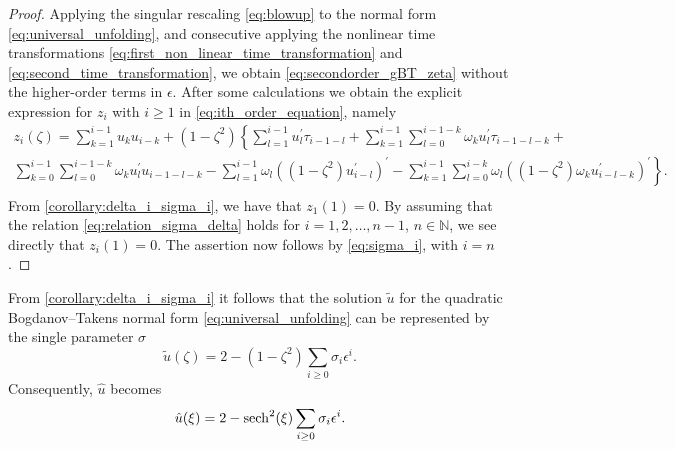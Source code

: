 \begin{proof}
    Applying the singular rescaling \cref{eq:blowup} to the normal form
    \cref{eq:universal_unfolding}, and consecutive applying the nonlinear time
    transformations \cref{eq:first_non_linear_time_transformation} and
    \cref{eq:second_time_transformation}, we obtain
    \cref{eq:secondorder_gBT_zeta} without the higher-order terms in $\epsilon$.
    After some calculations we obtain the explicit expression for $z_i$ with
    $i\geq 1$ in \cref{eq:ith_order_equation}, namely
    \begin{align*}
    z_i(\zeta) = 
         \sum_{k=1}^{i-1} u_k u_{i-k} 
         + (1-\zeta^2) \left\{ \sum_{l=1}^{i-1} 
          u_l^\prime \tau_{i-1-l}
         + \sum_{k=1}^{i-1} \sum_{l=0}^{i-1-k} 
           \omega_k u_l^\prime \tau_{i-1-l-k} + \right. \\
           \left. 
           \sum_{k=0}^{i-1} \sum_{l=0}^{i-1-k}
           \omega_k u_l^\prime u_{i-1-l-k} 
         - \sum_{l=1}^{i-1}
           \omega_l \left((1-\zeta^2)
           u_{i-l}^\prime \right)^\prime
         - \sum_{k=1}^{i-1} \sum_{l=0}^{i-k}
           \omega_l \left((1-\zeta^2)\omega_k u_{i-l-k}^\prime
           \right)^\prime \right\}. \nonumber \\
    \end{align*}
    From \cref{corollary:delta_i_sigma_i}, we have that $z_1(1)=0$. By
    assuming that the relation \cref{eq:relation_sigma_delta} holds for
    $i=1,2,\dots,n-1$,  $n\in\mathbb N$, we see directly that  $z_i(1)=0$. The
    assertion now follows by \cref{eq:sigma_i}, with $i=n$.
\end{proof}

\begin{remark}
    From \cref{corollary:delta_i_sigma_i} it follows that the solution $\tilde
    u$ for the quadratic Bogdanov--Takens normal form
    \cref{eq:universal_unfolding} can be represented by the single parameter
    $\sigma$
    \begin{equation*}
        \tilde u(\zeta) = 2 - (1-\zeta^2)\sum_{i\geq 0} \sigma_i \epsilon^i.
    \end{equation*}
    Consequently, $\hat u$ becomes
    \begin{equation*}
        \hat u(\xi) = 2 - \operatorname{sech}^2(\xi) \sum_{i\geq 0} \sigma_i \epsilon^i.
    \end{equation*}
\end{remark}


